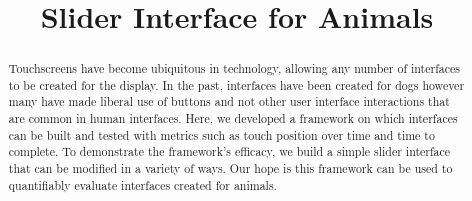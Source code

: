 \documentclass[conference]{IEEEtran}
\begin{document}
    \title{Slider Interface for Animals\\}

    \author{
    \and
    \and
    \and
    }
    
    \maketitle    

    \begin{abstract}
    Touchscreens have become ubiquitous in technology, allowing any number of interfaces to be created for the display. In the past, interfaces have been created for dogs however many have made liberal use of buttons and not other user interface interactions that are common in human interfaces. Here, we developed a framework on which interfaces can be built and tested with metrics such as touch position over time and time to complete. To demonstrate the framework’s efficacy, we build a simple slider interface that can be modified in a variety of ways. Our hope is this framework can be used to quantifiably evaluate interfaces created for animals.
    \end{abstract}
\end{document}
